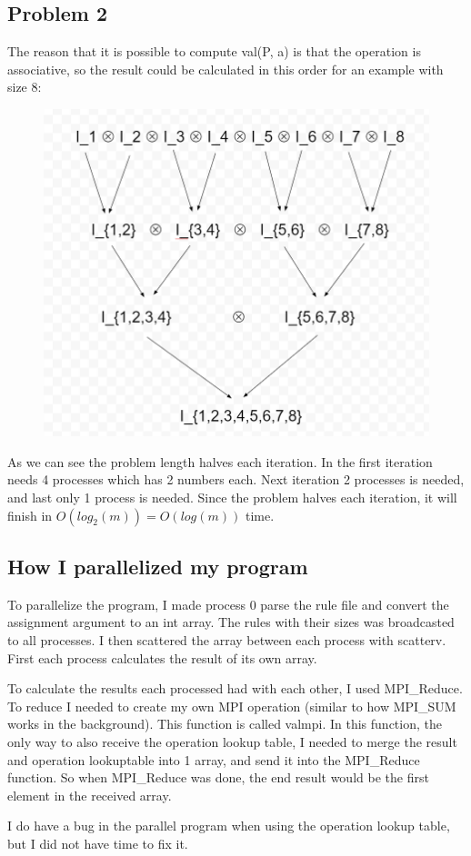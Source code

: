 \documentclass[a4paper]{extarticle}
\begin{document}
\subsection{Problem 2}
The reason that it is possible to compute val(P, a) is that the operation is associative, so the result could be calculated in this order for an example with size 8:

\begin{figure}[!h]
	\centering
	\includegraphics[scale=0.5]{Problemset_1_P3_2.png}
\end{figure}

As we can see the problem length halves each iteration. In the first iteration needs 4 processes which has 2 numbers each. Next iteration 2 processes is needed, and last only 1 process is needed. Since the problem halves each iteration, it will finish in $O(log_2(m)) = O(log(m))$ time.

\subsection{How I parallelized my program}
To parallelize the program, I made process 0 parse the rule file and convert the assignment argument to an int array. The rules with their sizes was broadcasted to all processes. I then scattered the array between each process with scatterv. First each process calculates the result of its own array. 

To calculate the results each processed had with each other, I used MPI\_Reduce. To reduce I needed to create my own MPI operation (similar to how MPI\_SUM works in the background). This function is called valmpi. In this function, the only way to also receive the operation lookup table, I needed to merge the result and operation lookuptable into 1 array, and send it into the MPI\_Reduce function. So when MPI\_Reduce was done, the end result would be the first element in the received array.

I do have a bug in the parallel program when using the operation lookup table, but I did not have time to fix it.
\end{document}

